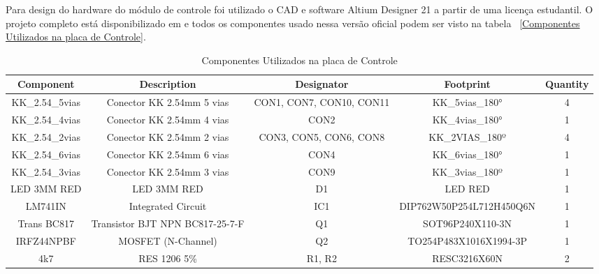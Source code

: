 \documentclass[../poliXuniversity_hospital_-USP-report.tex]{subfiles}
\begin{document}
Para design do hardware do módulo de controle foi utilizado o CAD e software Altium Designer 21 \cite{altium21} a partir de uma licença estudantil. O projeto completo está disponibilizado em \cite{github_modulos} e todos os componentes usado nessa versão oficial podem ser visto na tabela ~\ref{Componentes Utilizados na placa de Controle}.

\begin{table}[h]
\caption{Componentes Utilizados na placa de Controle}
\centering
\begin{adjustbox}{width=\columnwidth,center}
\begin{tabular}{|c|c|c|c|c|}
\hline
Component        & Description                                    & Designator                 & Footprint                & Quantity \\ \hline
KK\_2.54\_5vias  & Conector KK 2.54mm 5   vias                    & CON1, CON7, CON10,   CON11 & KK\_5vias\_180°          & 4        \\ \hline
KK\_2.54\_4vias  & Conector KK 2.54mm 4   vias                    & CON2                       & KK\_4vias\_180°          & 1        \\ \hline
KK\_2.54\_2vias  & Conector KK 2.54mm 2   vias                    & CON3, CON5, CON6,   CON8   & KK\_2VIAS\_180º          & 4        \\ \hline
KK\_2.54\_6vias  & Conector KK 2.54mm 6   vias                    & CON4                       & KK\_6vias\_180°          & 1        \\ \hline
KK\_2.54\_3vias  & Conector KK 2.54mm 3   vias                    & CON9                       & KK\_3vias\_180º          & 1        \\ \hline
LED 3MM RED      & LED 3MM RED                                    & D1                         & LED RED                  & 1        \\ \hline
LM741IN          & Integrated Circuit                             & IC1                        & DIP762W50P254L712H450Q6N & 1        \\ \hline
Trans BC817      & Transistor BJT NPN   BC817-25-7-F              & Q1                         & SOT96P240X110-3N         & 1        \\ \hline
IRFZ44NPBF       & MOSFET (N-Channel)                             & Q2                         & TO254P483X1016X1994-3P   & 1        \\ \hline
4k7              & RES 1206 5\%                                   & R1, R2                     & RESC3216X60N             & 2        \\ \hline

\end{tabular}
\end{adjustbox}
\end{table}
\end{document}
